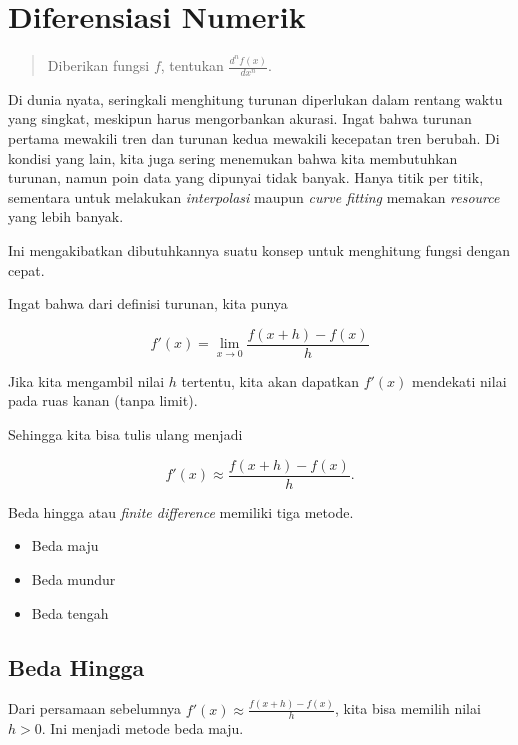 \hypertarget{diferensiasi-numerik}{%
\chapter{Diferensiasi Numerik}\label{diferensiasi-numerik}}

    \begin{quote}
Diberikan fungsi \(f\), tentukan
\(\displaystyle{\frac{d^n f(x)}{dx^n}}\).
\end{quote}

    Di dunia nyata, seringkali menghitung turunan diperlukan dalam rentang
waktu yang singkat, meskipun harus mengorbankan akurasi. Ingat bahwa
turunan pertama mewakili tren dan turunan kedua mewakili kecepatan tren
berubah. Di kondisi yang lain, kita juga sering menemukan bahwa kita
membutuhkan turunan, namun poin data yang dipunyai tidak banyak. Hanya
titik per titik, sementara untuk melakukan \emph{interpolasi} maupun
\emph{curve fitting} memakan \emph{resource} yang lebih banyak.

    Ini mengakibatkan dibutuhkannya suatu konsep untuk menghitung fungsi
dengan cepat.

    Ingat bahwa dari definisi turunan, kita punya

\[ f'(x) = \lim \limits_{x \to 0} \frac{f(x+h) - f(x)}{h} \]

Jika kita mengambil nilai \(h\) tertentu, kita akan dapatkan \(f'(x)\)
mendekati nilai pada ruas kanan (tanpa limit).

    Sehingga kita bisa tulis ulang menjadi

\[ f'(x)  \approx \frac{f(x+h) - f(x)}{h}. \]

    Beda hingga atau \emph{finite difference} memiliki tiga metode.

\begin{itemize}
\tightlist
\item
  Beda maju
\item
  Beda mundur
\item
  Beda tengah
\end{itemize}

    \hypertarget{beda-hingga}{%
\section{Beda Hingga}\label{beda-hingga}}

    Dari persamaan sebelumnya \(f'(x) \approx \frac{f(x+h) - f(x)}{h}\),
kita bisa memilih nilai \(h>0\). Ini menjadi metode beda maju.

